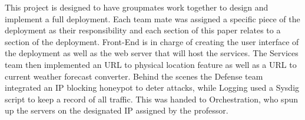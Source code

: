 This project is designed to have groupmates work together to design and implement a full deployment. Each team mate was assigned a specific piece of the deployment as their responsibility and each section of this paper relates to a section of the deployment. Front-End is in charge of creating the user interface of the deployment as well as the web server that will host the services. The Services team then implemented an URL to physical location feature as well as a URL to current weather forecast converter. Behind the scenes the Defense team integrated an IP blocking honeypot to deter attacks, while Logging used a Sysdig script to keep a record of all traffic. This was handed to Orchestration, who spun up the servers on the designated IP assigned by the professor. 
